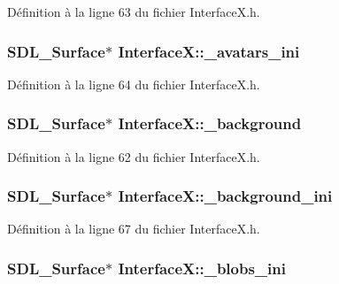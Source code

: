 Définition à la ligne 63 du fichier InterfaceX.h.

\hypertarget{a00011_a34d0862fbbbfbf487e623abd4b478f54}{
\subsubsection[{\_\-avatars\_\-ini}]{\setlength{\rightskip}{0pt plus 5cm}SDL\_\-Surface$\ast$ {\bf InterfaceX::\_\-avatars\_\-ini}}}
\label{a00011_a34d0862fbbbfbf487e623abd4b478f54}


Définition à la ligne 64 du fichier InterfaceX.h.

\hypertarget{a00011_a6020a5ecde63a9807c9e9be10cf0ed6f}{
\subsubsection[{\_\-background}]{\setlength{\rightskip}{0pt plus 5cm}SDL\_\-Surface$\ast$ {\bf InterfaceX::\_\-background}}}
\label{a00011_a6020a5ecde63a9807c9e9be10cf0ed6f}


Définition à la ligne 62 du fichier InterfaceX.h.

\hypertarget{a00011_a304a7dbac538a6b5713c20f0affd498e}{
\subsubsection[{\_\-background\_\-ini}]{\setlength{\rightskip}{0pt plus 5cm}SDL\_\-Surface$\ast$ {\bf InterfaceX::\_\-background\_\-ini}}}
\label{a00011_a304a7dbac538a6b5713c20f0affd498e}


Définition à la ligne 67 du fichier InterfaceX.h.

\hypertarget{a00011_aafa3c968571905556bb0df1c12330475}{
\subsubsection[{\_\-blobs\_\-ini}]{\setlength{\rightskip}{0pt plus 5cm}SDL\_\-Surface$\ast$ {\bf InterfaceX::\_\-blobs\_\-ini}}}
\label{a00011_aafa3c968571905556bb0df1c12330475}


